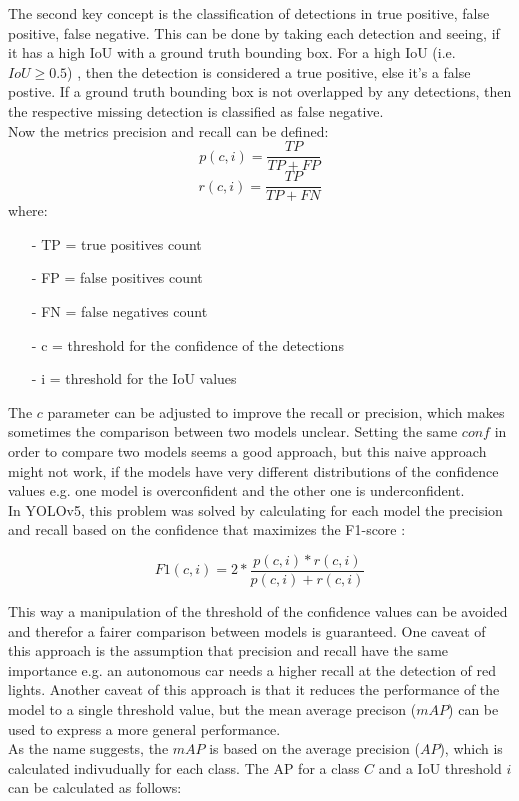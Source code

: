 The second key concept is the classification of detections in true positive, false positive, false negative. This can be done by taking each detection and seeing, if it has a high IoU with a ground truth bounding box. For a high IoU (i.e. $IoU \geq 0.5$) , then the detection is considered a true positive, else it's a false postive. If a ground truth bounding box is not overlapped by any detections, then the respective missing detection is classified as false negative.\\
Now the metrics precision and recall can be defined:
\begin{equation}
p(c,i) = \frac{TP}{TP + FP}
\end{equation}
\begin{equation}
r(c,i) = \frac{TP}{TP + FN}
\end{equation}
where:
\begin{itemize}
\item[-]{TP = true positives count}
\item[-]{FP = false positives count}
\item[-]{FN = false negatives count}
\item[-]{c = threshold for the confidence of the detections}
\item[-]{i = threshold for the IoU values}
\end{itemize}

The $c$ parameter can be adjusted to improve the recall or precision, which makes sometimes the comparison between two models unclear. Setting the same $conf$ in order to compare two models seems a good approach, but this naive approach might not work, if the models have very different distributions of the confidence values e.g. one model is overconfident and the other one is underconfident. \\
In YOLOv5, this problem was solved by calculating for each model the precision and recall based on the confidence that maximizes the F1-score  \cite{yolov5_conf}:

\begin{equation}
F1(c,i) = 2 * \frac{ p(c,i) * r(c,i)}{p(c,i) + r(c,i)}
\end{equation}

This way a manipulation of the threshold of the confidence values can be avoided and therefor a fairer comparison between models is guaranteed. One caveat of this approach is the assumption that precision and recall have the same importance e.g. an autonomous car needs a higher recall at the detection of red lights. Another caveat of this approach is that it reduces the performance of the model to a single threshold value, but the mean average precison ($mAP$) can be used to express a more general performance. \\
As the name suggests, the $mAP$ is based on the average precision ($AP$), which is calculated indivudually for each class. The AP for a class $C$ and a IoU threshold $i$ can be calculated as follows:

